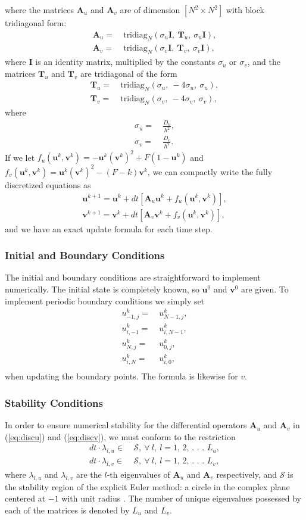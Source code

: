 \documentclass[a4paper,11pt]{article}
\newcommand{\ba}[1]{\begin{align*}    #1    \end{align*}}
\newcommand{\ban}[1]{\begin{align}    #1    \end{align}}
\renewcommand{\vec}[1]{\mathbf{#1}}
\begin{document}
\endgroup
where the matrices $\vec{A}_u$ and $\vec{A}_v$ are of dimension $[N^2 \times N^2]$ with block tridiagonal form:
\ba{
\vec{A}_u = & \ \text{tridiag}_N(\sigma_u\vec{I}, \ \vec{T}_u, \ \sigma_u\vec{I}), \\
\vec{A}_v = & \ \text{tridiag}_N(\sigma_v\vec{I}, \ \vec{T}_v, \ \sigma_v\vec{I}),
}
where $\vec{I}$ is an identity matrix, multiplied by the constants $\sigma_u$ or $\sigma_v$, and the matrices $\vec{T}_u$ and $\vec{T}_v$ are tridiagonal of the form
\ba{
\vec{T}_u = & \ \text{tridiag}_N(\sigma_u, \ -4\sigma_u, \ \sigma_u), \\
\vec{T}_v = & \ \text{tridiag}_N(\sigma_v, \ -4\sigma_v, \ \sigma_v),
}
where 
\begingroup
\addtolength{\jot}{0.5em}
\ba{
\sigma_u =& \ \frac{D_u}{h^2}, \\
\sigma_v =& \ \frac{D_v}{h^2}.
}
\endgroup
If we let $f_u(\vec{u}^{k},\vec{v}^{k}) = -\vec{u}^k (\vec{v}^k)^2 + F(1-\vec{u}^k)$ and $ f_v(\vec{u}^{k},\vec{v}^{k}) = \vec{u}^k (\vec{v}^k)^2 - (F-k)\vec{v}^k$, we can compactly write the fully discretized equations as
\ban{
\label{eq:discu}
\vec{u}^{k+1} = \vec{u}^{k} + dt [\vec{A}_u \vec{u}^{k} + f_u(\vec{u}^{k},\vec{v}^{k})],\\
\label{eq:discv}
\vec{v}^{k+1} = \vec{v}^{k} + dt [\vec{A}_v \vec{v}^{k} + f_v(\vec{u}^{k},\vec{v}^{k})],
}
and we have an exact update formula for each time step.
\subsubsection*{Initial and Boundary Conditions}
The initial and boundary conditions are straightforward to implement numerically.  The initial state is completely known, so $\vec{u}^0$ and $\vec{v}^0$ are given.  To implement periodic boundary conditions we simply set
\ba{
u_{-1,j}^k = & \ u_{N-1,j}^k, \\
u_{i,-1}^k =& \  u_{i,N-1}^k, \\
u_{N,j}^k =& \  u_{0,j}^k,\\ 
u_{i,N}^k = & \ u_{i,0}^k,\\ 
}
when updating the boundary points.  The formula is likewise for $v$.

\subsubsection*{Stability Conditions}
In order to ensure numerical stability for the differential operators $\vec{A}_u$ and $\vec{A}_v$ in  (\ref{eq:discu}) and (\ref{eq:discv}), we must conform to the restriction
\ba{
dt \cdot \lambda_{l,u} \in & \ \mathcal{S}, \ \forall  \ l, \ l = \text{1, 2, . . . $L_u$},\\
dt \cdot \lambda_{l,v} \in & \ \mathcal{S}, \ \forall  \ l, \ l = \text{1, 2, . . . $L_v$},
}
where $\lambda_{l,u}$ and $\lambda_{l,v}$ are the $l$-th eigenvalues of $\vec{A}_u$ and $\vec{A}_v$ respectively,  and $\mathcal{S}$ is the stability region of the explicit Euler method: a circle in the complex plane centered at $-1$ with unit radius \cite{Edsberg}.  The number of unique eigenvalues possessed by each of the matrices is denoted by $L_u$ and $L_v$.   
\end{document}
